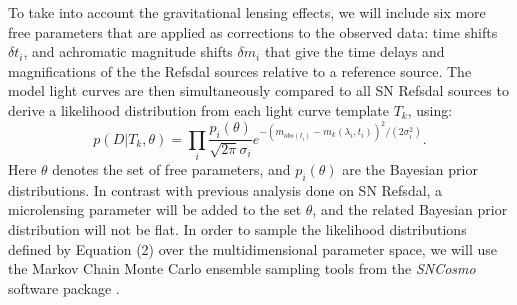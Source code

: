 To take into account the gravitational lensing effects, we will include six more free parameters that are
applied as corrections to the observed data: time shifts $\delta t_i$, and achromatic magnitude
shifts $\delta m_i$ that give the time delays and magnifications of the the Refsdal sources relative to
a reference source. The model light curves are then simultaneously compared to all SN Refsdal sources
to derive a likelihood distribution from each light curve template $T_k$, using:
\begin{equation}
p(D|T_k,\theta)=\prod\limits_i\frac{p_i(\theta)}{\sqrt{2\pi}\sigma_i}e^{-(m_{obs(t_i)}-m_k(\lambda_i,t_i))^2
/(2\sigma^2_i)}.
\end{equation}
Here $\theta$ denotes the set of free parameters, and $p_i(\theta)$ are the Bayesian prior distributions. 
In contrast with previous analysis done on SN Refsdal, a microlensing parameter will be added to the set 
$\theta$, and the related Bayesian prior distribution will not be flat. In order to sample the likelihood distributions 
defined by Equation (2) over the multidimensional parameter space, we will use the Markov Chain Monte Carlo
ensemble sampling tools from the \textit{SNCosmo} software package \citep{Barbary:2014}.


